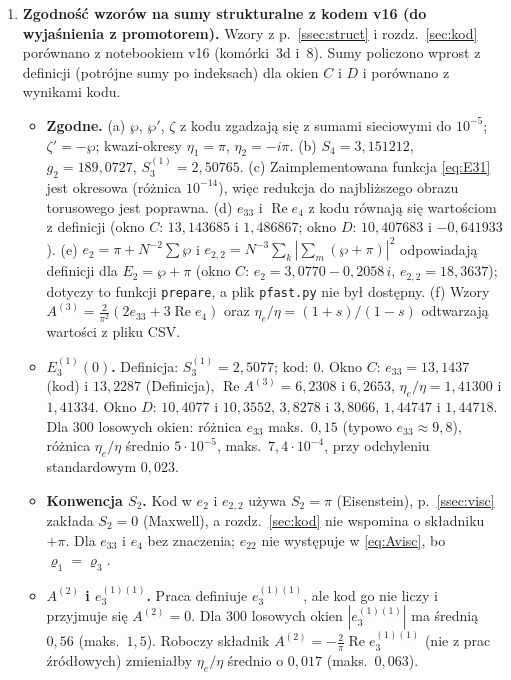 \documentclass[12pt,a4paper,twoside,openright]{report}
\theoremstyle{definition}
\theoremstyle{remark}
\newcommand{\czer}[1]{{\color{red}#1}}
\renewcommand{\Re}{\operatorname{Re}}
\begin{document}
\begin{enumerate}[nosep]
\item\label{it:weryf} \czer{\textbf{Zgodność wzorów na sumy strukturalne z kodem v16 (do wyjaśnienia z promotorem).} Wzory z p.~\ref{ssec:struct} i rozdz.~\ref{sec:kod} porównano z notebookiem v16 (komórki~3d i~8). Sumy policzono wprost z definicji (potrójne sumy po indeksach) dla okien $C$ i $D$ i porównano z wynikami kodu.
\begin{itemize}[nosep]
\item \textbf{Zgodne.} (a) $\wp$, $\wp'$, $\zeta$ z kodu zgadzają się z sumami sieciowymi do $10^{-5}$; $\zeta'=-\wp$; kwazi-okresy $\eta_1=\pi$, $\eta_2=-i\pi$. (b) $S_4=3{,}151212$, $g_2=189{,}0727$, $S_3^{(1)}=2{,}50765$. (c) Zaimplementowana funkcja \eqref{eq:E31} jest okresowa (różnica $10^{-14}$), więc redukcja do najbliższego obrazu torusowego jest poprawna. (d) $e_{33}$ i $\Re e_4$ z kodu równają się wartościom z definicji (okno $C$: $13{,}143685$ i $1{,}486867$; okno $D$: $10{,}407683$ i $-0{,}641933$). (e) $e_2=\pi+N^{-2}\sum\wp$ i $e_{2,2}=N^{-3}\sum_k|\sum_m(\wp+\pi)|^2$ odpowiadają definicji dla $E_2=\wp+\pi$ (okno $C$: $e_2=3{,}0770-0{,}2058\,i$, $e_{2,2}=18{,}3637$); dotyczy to funkcji \texttt{prepare}, a plik \texttt{pfast.py} nie był dostępny. (f) Wzory $A^{(3)}=\frac2{\pi^2}(2e_{33}+3\Re e_4)$ oraz $\eta_e/\eta=(1+s)/(1-s)$ odtwarzają wartości z pliku CSV.
\item \textbf{$E_3^{(1)}(0)$.} Definicja: $S_3^{(1)}=2{,}5077$; kod: $0$. Okno $C$: $e_{33}=13{,}1437$ (kod) i $13{,}2287$ (Definicja), $\Re A^{(3)}=6{,}2308$ i $6{,}2653$, $\eta_e/\eta=1{,}41300$ i $1{,}41334$. Okno $D$: $10{,}4077$ i $10{,}3552$, $3{,}8278$ i $3{,}8066$, $1{,}44747$ i $1{,}44718$. Dla 300 losowych okien: różnica $e_{33}$ maks.\ $0{,}15$ (typowo $e_{33}\approx9{,}8$), różnica $\eta_e/\eta$ średnio $5\cdot10^{-5}$, maks.\ $7{,}4\cdot10^{-4}$, przy odchyleniu standardowym $0{,}023$.
\item \textbf{Konwencja $S_2$.} Kod w $e_2$ i $e_{2,2}$ używa $S_2=\pi$ (Eisenstein), p.~\ref{ssec:visc} zakłada $S_2=0$ (Maxwell), a rozdz.~\ref{sec:kod} nie wspomina o składniku $+\pi$. Dla $e_{33}$ i $e_4$ bez znaczenia; $e_{22}$ nie występuje w \eqref{eq:Avisc}, bo $\varrho_1=\varrho_3$.
\item \textbf{$A^{(2)}$ i $e_3^{(1)(1)}$.} Praca definiuje $e_3^{(1)(1)}$, ale kod go nie liczy i przyjmuje się $A^{(2)}=0$. Dla 300 losowych okien $|e_3^{(1)(1)}|$ ma średnią $0{,}56$ (maks.\ $1{,}5$). Roboczy składnik $A^{(2)}=-\frac2\pi\Re e_3^{(1)(1)}$ (nie z prac źródłowych) zmieniałby $\eta_e/\eta$ średnio o $0{,}017$ (maks.\ $0{,}063$).

\end{itemize}}
\end{enumerate}
\end{document}
